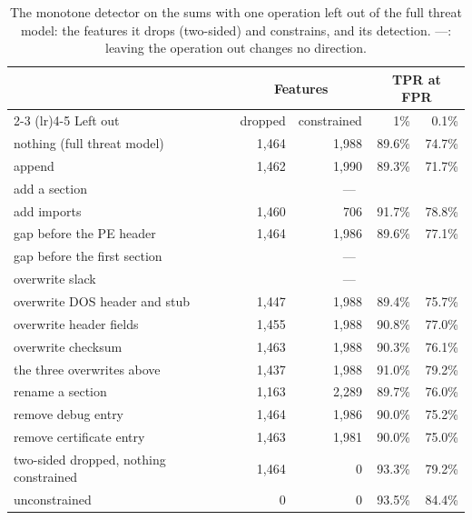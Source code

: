 \documentclass[sigconf,anonymous,acmthm=false]{acmart}
\begin{document}
\begin{table}[H]
  \caption{The monotone detector on the sums with one operation left out of the full threat model: the features it
  drops (two-sided) and constrains, and its detection. ---: leaving the operation out changes no direction.}
  \label{tab:ops}
  \footnotesize
  \setlength{\tabcolsep}{4pt}
  \begin{tabular}{@{}lrrrr@{}}
    \toprule
    & \multicolumn{2}{c}{Features} & \multicolumn{2}{c}{TPR at FPR} \\
    \cmidrule(lr){2-3} \cmidrule(lr){4-5}
    Left out & dropped & constrained & 1\% & 0.1\% \\
    \midrule
    nothing (full threat model) & 1,464 & 1,988 & 89.6\% & 74.7\% \\
    \addlinespace
    append & 1,462 & 1,990 & 89.3\% & 71.7\% \\
    add a section & \multicolumn{4}{c}{---} \\
    add imports & 1,460 & 706 & 91.7\% & 78.8\% \\
    gap before the PE header & 1,464 & 1,986 & 89.6\% & 77.1\% \\
    gap before the first section & \multicolumn{4}{c}{---} \\
    overwrite slack & \multicolumn{4}{c}{---} \\
    overwrite DOS header and stub & 1,447 & 1,988 & 89.4\% & 75.7\% \\
    overwrite header fields & 1,455 & 1,988 & 90.8\% & 77.0\% \\
    overwrite checksum & 1,463 & 1,988 & 90.3\% & 76.1\% \\
    \quad the three overwrites above & 1,437 & 1,988 & 91.0\% & 79.2\% \\
    rename a section & 1,163 & 2,289 & 89.7\% & 76.0\% \\
    remove debug entry & 1,464 & 1,986 & 90.0\% & 75.2\% \\
    remove certificate entry & 1,463 & 1,981 & 90.0\% & 75.0\% \\
    \addlinespace
    two-sided dropped, nothing constrained & 1,464 & 0 & 93.3\% & 79.2\% \\
    unconstrained & 0 & 0 & 93.5\% & 84.4\% \\
    \bottomrule
  \end{tabular}
\end{table}
\end{document}
